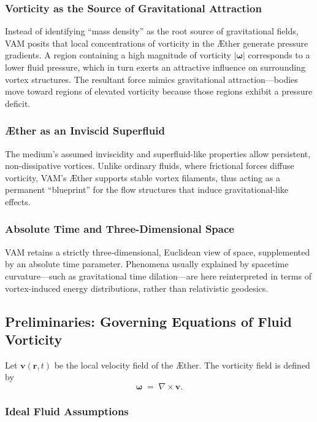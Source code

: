 \documentclass[aps,preprint,superscriptaddress]{revtex4-2}
\begin{document}
    \subsubsection{Vorticity as the Source of Gravitational Attraction}
    Instead of identifying “mass density” as the root source of gravitational fields, VAM posits that local concentrations of vorticity in the Æther generate pressure gradients. A region containing a high magnitude of vorticity \(\lvert \boldsymbol{\omega} \rvert\) corresponds to a lower fluid pressure, which in turn exerts an attractive influence on surrounding vortex structures. The resultant force mimics gravitational attraction—bodies move toward regions of elevated vorticity because those regions exhibit a pressure deficit.

    \subsubsection{Æther as an Inviscid Superfluid}
    The medium’s assumed inviscidity and superfluid-like properties allow persistent, non-dissipative vortices. Unlike ordinary fluids, where frictional forces diffuse vorticity, VAM’s Æther supports stable vortex filaments, thus acting as a permanent “blueprint” for the flow structures that induce gravitational-like effects.

    \subsubsection{Absolute Time and Three-Dimensional Space}
    VAM retains a strictly three-dimensional, Euclidean view of space, supplemented by an absolute time parameter. Phenomena usually explained by spacetime curvature—such as gravitational time dilation—are here reinterpreted in terms of vortex-induced energy distributions, rather than relativistic geodesics.

    \subsection{Preliminaries: Governing Equations of Fluid Vorticity}

    Let \(\mathbf{v}(\mathbf{r},t)\) be the local velocity field of the Æther. The vorticity field is defined by
    \[
        \boldsymbol{\omega} \;=\; \nabla \times \mathbf{v}.
    \]

    \subsubsection{Ideal Fluid Assumptions}
\end{document}
